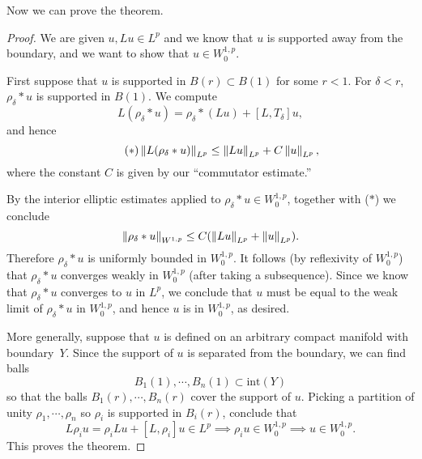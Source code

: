    Now we can prove the theorem.
   \begin{proof}
     We are given $u,Lu\in L^{p}$ and we know that $u$ is supported
     away from the boundary, and we want to show that $u\in
     W^{1,p}_{0}$.

     First suppose that $u$ is supported in $B(r)\subset B(1)$ for
     some $r<1$. For $\delta<r$, $\rho_{\delta}\ast u$ is supported in
     $B(1)$. We compute
     \begin{equation*}
       L(\rho_{\delta}\ast u)=\rho_{\delta}\ast (L u)+[L,T_{\delta}]u,
     \end{equation*}
     and hence
     \begin{equation*}\tag{$\ast$}
       \left\lVert L(\rho_{\delta}\ast u)\right\rVert_{L^{p}}\le \left\lVert Lu\right\rVert_{L^{p}}+C\left\lVert u\right\rVert_{L^{p}},
     \end{equation*}
     where the constant $C$ is given by our ``commutator estimate.''

     By the interior elliptic estimates applied to $\rho_{\delta}\ast
     u\in W^{1,p}_{0}$, together with ($\ast$) we conclude
     \begin{equation*}
       \left\lVert\rho_{\delta}\ast u\right\rVert_{W^{1,p}}\le C(\left\lVert Lu\right\rVert_{L^{p}}+\left\lVert u\right\rVert_{L^{p}}).
     \end{equation*}
     Therefore $\rho_{\delta}\ast u$ is uniformly bounded in
     $W^{1,p}_{0}$. It follows (by reflexivity of $W^{1,p}_{0}$) that
     $\rho_{\delta}\ast u$ converges weakly in $W^{1,p}_{0}$ (after
     taking a subsequence). Since we know that $\rho_{\delta}\ast u$
     converges to $u$ in $L^{p}$, we conclude that $u$ must be equal
     to the weak limit of $\rho_{\delta}\ast u$ in $W^{1,p}_{0}$, and
     hence $u$ is in $W^{1,p}_{0}$, as desired.

     More generally, suppose that $u$ is defined on an arbitrary
     compact manifold with boundary~$Y$. Since the support of $u$ is
     separated from the boundary, we can find balls
     $$B_{1}(1),\cdots,B_{n}(1)\subset \text{int}(Y)$$ so that the balls
     $B_{1}(r),\cdots,B_{n}(r)$ cover the support of $u$. Picking a
     partition of unity $\rho_{1},\cdots,\rho_{n}$ so $\rho_{i}$ is
     supported in $B_{i}(r)$, conclude that
     \begin{equation*}
       L\rho_{i}u=\rho_{i}Lu+[L,\rho_{i}]u\in L^{p}\implies
       \rho_{i}u\in W^{1,p}_{0}\implies u\in W^{1,p}_{0}.
     \end{equation*}     
     This proves the theorem.     
   \end{proof}
